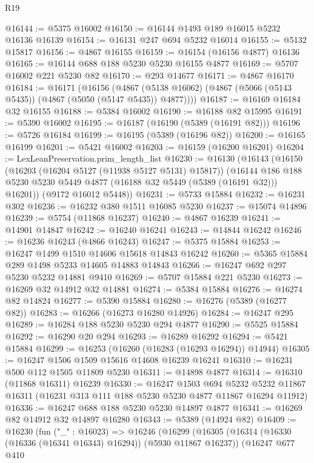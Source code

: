 \begin{lexlean}{R19}
\begin{coremodule}
@16144 := @5375 @16002
@16150 := @16144 @1493 @189 @16015 @5232 @16136 @16139
@16154 := @16131 @247 @694 @5232 @16014
@16155 := @5132 @15817
@16156 := @4867 @16155
@16159 := @16154 (@16156 @4877) @16136
@16165 := @16144 @688 @188 @5230 @5230 @16155 @4877
@16169 := @5707 @16002 @221 @5230 @82
@16170 := @293 @14677
@16171 := @4867 @16170
@16184 := @16171
    (@16156
      (@4867 (@5138 @16062) (@4867 (@5066 (@5143 @5435)) (@4867 (@5050 (@5147 @5435)) @4877))))
@16187 := @16169 @16184 @32 @16155
@16188 := @5384 @16002
@16190 := @16188 @82 @15995
@16191 := @5390 @16002
@16195 := @16187 (@16190 (@5389 (@16191 @82)))
@16196 := @5726 @16184
@16199 := @16195 (@5389 (@16196 @82))
@16200 := @16165 @16199
@16201 := @5421 @16002
@16203 := @16159 (@16200 @16201)
@16204 := LexLeanPreservation.prim_length_list
@16230 := @16130
    (@16143
      (@16150
        (@16203 (@16204 @5127 (@11938 @5127 @5131) @15817))
        (@16144 @186 @188 @5230 @5230 @5449 @4877 (@16188 @32 @5449 (@5389 (@16191 @32))) @16201))
      (@9172 @16012 @5448))
@16231 := @5733 @15884
@16232 := @16231 @302
@16236 := @16232 @380 @1511 @16085 @5230
@16237 := @15074 @14896
@16239 := @5754 (@11868 @16237)
@16240 := @4867 @16239
@16241 := @14901 @14847
@16242 := @16240 @16241
@16243 := @14844 @16242
@16246 := @16236 @16243 (@4866 @16243)
@16247 := @5375 @15884
@16253 := @16247 @1499 @1510 @14606 @15618 @14843 @16242
@16260 := @5365 @15884 @289 @1498 @5233 @14605 @14883 @14843
@16266 := @16247 @692 @297 @5230 @5232 @14881 @9410
@16269 := @5707 @15884 @221 @5230
@16273 := @16269 @32 @14912 @32 @14881
@16274 := @5384 @15884
@16276 := @16274 @82 @14824
@16277 := @5390 @15884
@16280 := @16276 (@5389 (@16277 @82))
@16283 := @16266 (@16273 @16280 @14926)
@16284 := @16247 @295
@16289 := @16284 @188 @5230 @5230 @294 @4877
@16290 := @5525 @15884
@16292 := @16290 @20 @294
@16293 := @16289 @16292
@16294 := @5421 @15884
@16299 := @16253 (@16260 (@16283 (@16293 @16294)) @14944)
@16305 := @16247 @1506 @1509 @15616 @14608 @16239 @16241
@16310 := @16231 @500 @112 @1505 @11809 @5230
@16311 := @14898 @4877
@16314 := @16310 (@11868 @16311) @16239
@16330 := @16247
    @1503
    @694
    @5232
    @5232
    @11867
    @16311
    (@16231 @313 @111 @188 @5230 @5230 @4877 @11867 @16294 @11912)
@16336 := @16247 @688 @188 @5230 @5230 @14897 @4877
@16341 := @16269 @82 @14912 @32 @14897 @16280
@16343 := @5389 (@14924 @82)
@16409 := @16230
    (fun ("_" : @16023) =>
    @16246
      (@16299
        (@16305
          (@16314 (@16330 (@16336 (@16341 @16343) @16294)) (@5930 @11867 @16237))
          (@16247
            @677
            @410

\end{coremodule}
\end{lexlean}
